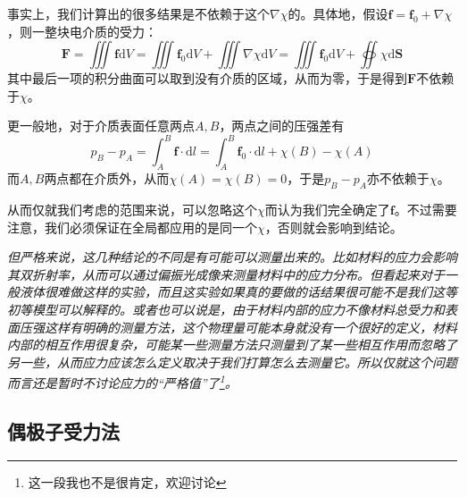 \documentclass{ctexart}
\begin{document}
	事实上，我们计算出的很多结果是不依赖于这个$\nabla\chi$的。具体地，假设$\mathbf f=\mathbf f_0+\nabla\chi$，则一整块电介质的受力：
	\begin{equation}
	\mathbf F=\iiint\mathbf f\mathrm dV=\iiint \mathbf f_0\mathrm dV+\iiint\nabla\chi \mathrm dV=\iiint \mathbf f_0\mathrm dV+\oiint\chi \mathrm d\mathbf S
	\end{equation}
	其中最后一项的积分曲面可以取到没有介质的区域，从而为零，于是得到$\mathbf F$不依赖于$\chi$。
	
	更一般地，对于介质表面任意两点$A,B$，两点之间的压强差有
	\begin{equation}
	p_B-p_A=\int_A^B\mathbf f\cdot\mathrm dl=\int_A^B\mathbf f_0\cdot\mathrm dl+\chi(B)-\chi(A)
	\end{equation}
	而$A,B$两点都在介质外，从而$\chi(A)=\chi(B)=0$，于是$p_B-p_A$亦不依赖于$\chi$。
	
	从而仅就我们考虑的范围来说，可以忽略这个$\chi$而认为我们完全确定了$\mathbf f$。不过需要注意，我们必须保证在全局都应用的是同一个$\chi$，否则就会影响到结论。
	
	{\itshape 但严格来说，这几种结论的不同是有可能可以测量出来的。比如材料的应力会影响其双折射率，从而可以通过偏振光成像来测量材料中的应力分布。但看起来对于一般液体很难做这样的实验，而且这实验如果真的要做的话结果很可能不是我们这等初等模型可以解释的。或者也可以说是，由于材料内部的应力不像材料总受力和表面压强这样有明确的测量方法，这个物理量可能本身就没有一个很好的定义，材料内部的相互作用很复杂，可能某一些测量方法只测量到了某一些相互作用而忽略了另一些，从而应力应该怎么定义取决于我们打算怎么去测量它。所以仅就这个问题而言还是暂时不讨论应力的“严格值”了\footnote{这一段我也不是很肯定，欢迎讨论}。}
	
	\subsection{偶极子受力法}\label{sec:DipoleForce}
	
\end{document}
